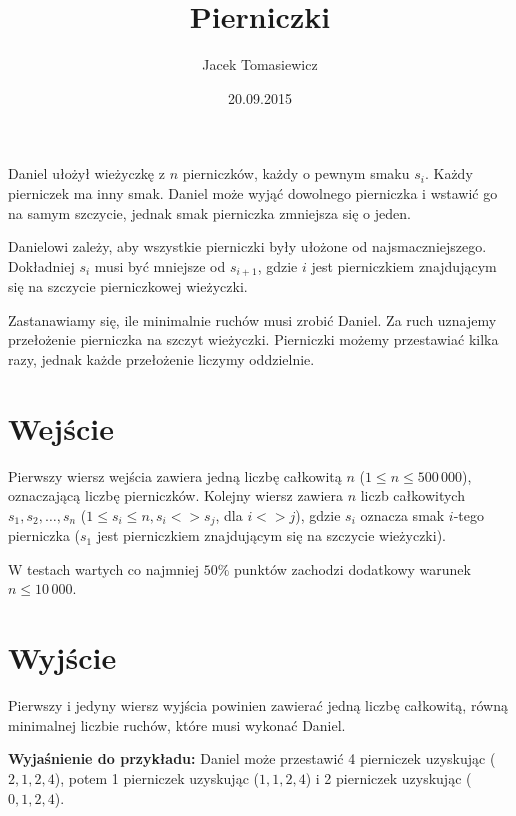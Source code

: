 \documentclass[zad,zawodnik,utf8]{sinol}
\title{Pierniczki}
\author{Jacek Tomasiewicz}
\date{20.09.2015}
\begin{document}
  \begin{tasktext}%
Daniel ułożył wieżyczkę z $n$ pierniczków, każdy o pewnym smaku $s_i$. Każdy pierniczek ma inny smak. Daniel może wyjąć dowolnego pierniczka i wstawić go na samym szczycie, jednak smak pierniczka zmniejsza się o jeden. 

Danielowi zależy, aby wszystkie pierniczki były ułożone od najsmaczniejszego. Dokładniej $s_i$ musi być mniejsze od $s_{i+1}$, gdzie $i$ jest pierniczkiem znajdującym się na szczycie pierniczkowej wieżyczki.

Zastanawiamy się, ile minimalnie ruchów musi zrobić Daniel. Za ruch uznajemy przełożenie pierniczka na szczyt wieżyczki. Pierniczki możemy przestawiać kilka razy, jednak każde przełożenie liczymy oddzielnie.

  \section{Wejście}
Pierwszy wiersz wejścia zawiera jedną liczbę całkowitą $n$ ($1 \leq n \leq 500\,000$), oznaczającą liczbę pierniczków. Kolejny wiersz zawiera $n$ liczb całkowitych $s_1, s_2, \ldots, s_n$ ($1 \leq s_i \leq n, s_i <> s_j$, dla $i <> j$), gdzie $s_i$ oznacza smak $i$-tego pierniczka ($s_1$ jest pierniczkiem znajdującym się na szczycie wieżyczki).

W testach wartych co najmniej $50\%$ punktów zachodzi dodatkowy warunek $n \leq 10\,000$.

  \section{Wyjście}
Pierwszy i jedyny wiersz wyjścia powinien zawierać jedną liczbę całkowitą, równą minimalnej liczbie ruchów, które musi wykonać Daniel.

     \makecompactexample

	\medskip
	\noindent
	\textbf{Wyjaśnienie do przykładu:} Daniel może przestawić 4 pierniczek uzyskując ($2, 1, 2, 4$), potem 1 pierniczek uzyskując ($1, 1, 2, 4$) i 2 pierniczek uzyskując ($0, 1, 2, 4$).

  \end{tasktext}
\end{document}
